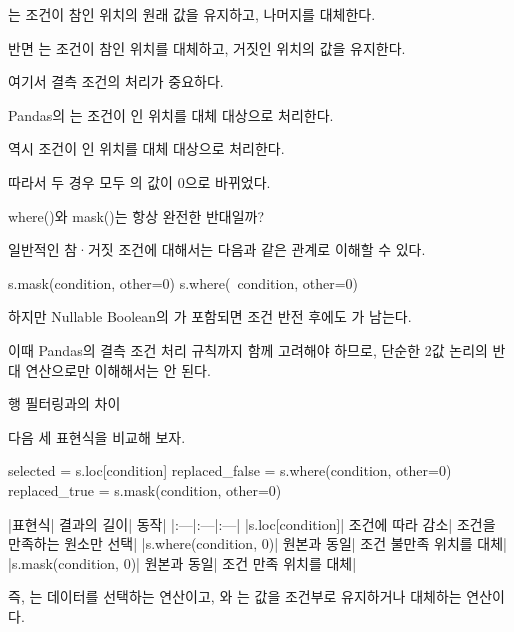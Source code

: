 는 조건이 참인 위치의 원래 값을 유지하고, 나머지를 대체한다.

반면 는 조건이 참인 위치를 대체하고, 거짓인 위치의 값을 유지한다.

여기서 결측 조건의 처리가 중요하다.

Pandas의 는 조건이 인 위치를 대체 대상으로 처리한다.

 역시 조건이 인 위치를 대체 대상으로 처리한다.

따라서 두 경우 모두 의 값이 0으로 바뀌었다.

\begin{dhknote}
\begin{dhksmry}[centered]
where()와 mask()는 항상 완전한 반대일까?
\end{dhksmry}
\end{dhknote}

일반적인 참·거짓 조건에 대해서는 다음과 같은 관계로 이해할 수 있다.

\begin{dhkcode}
s.mask(condition, other=0)
s.where(~condition, other=0)
\end{dhkcode}

하지만 Nullable Boolean의 가 포함되면 조건 반전 후에도 가 남는다.

이때 Pandas의 결측 조건 처리 규칙까지 함께 고려해야 하므로, 단순한 2값 논리의 반대 연산으로만 이해해서는 안 된다.

\begin{dhknote}
\begin{dhksmry}[centered]
행 필터링과의 차이
\end{dhksmry}
\end{dhknote}

다음 세 표현식을 비교해 보자.

\begin{dhkcode}
selected = s.loc[condition]
replaced_false = s.where(condition, other=0)
replaced_true = s.mask(condition, other=0)
\end{dhkcode}

\begin{dhktable}
|표현식|	결과의 길이|	동작|
|:---|:---|:---|
|s.loc[condition]|	조건에 따라 감소|	조건을 만족하는 원소만 선택|
|s.where(condition, 0)|	원본과 동일|	조건 불만족 위치를 대체|
|s.mask(condition, 0)|	원본과 동일|	조건 만족 위치를 대체|
\end{dhktable}

즉, 는 데이터를 선택하는 연산이고, 와 는 값을 조건부로 유지하거나 대체하는 연산이다.


